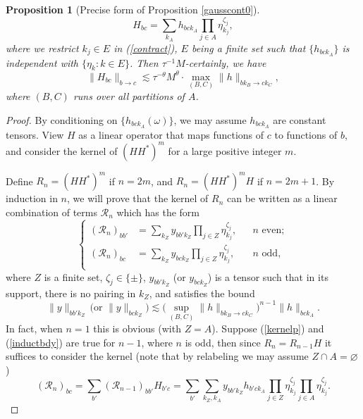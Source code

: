 \documentclass[11 pt,reqno]{amsart}
\newtheorem{prop}[thm]{Proposition}
\theoremstyle{definition}
\theoremstyle{remark}
\numberwithin{equation}{section}
\newcommand{\Rc}{\mathcal{R}}
\begin{document}
{\begin{prop}[Precise form of Proposition \ref{gausscont0}]
  \begin{equation}\label{contract}
  H_{bc}=\sum_{k_{A}}h_{bck_A}\prod_{j\in A}\eta_{k_j}^{\zeta_j},
  \end{equation}where we restrict $k_j\in E$ in (\ref{contract}), $E$ being a finite set such that $\{h_{bck_A}\}$ is independent with $\{\eta_k:k\in E\}$. Then $\tau^{-1}M$-certainly, we have
  \begin{equation}\label{contbd}\|H_{bc}\|_{b\to c}\lesssim\tau^{-\theta} M^\theta\cdot\max_{(B,C)}\|h\|_{bk_B\to ck_C},
  \end{equation} where $(B,C)$ runs over all partitions of $A$.
 \end{prop}
 \begin{proof} By conditioning on $\{h_{bck_A}(\omega)\}$, we may assume $h_{bck_A}$ are constant tensors. View $H$ as a linear operator that maps functions of $c$ to functions of $b$, and consider the kernel of $(HH^*)^m$ for a large positive integer $m$. 
 
Define $R_n=(HH^*)^m$ if $n=2m$, and $R_n=(HH^*)^mH$ if $n=2m+1$. By induction in $n$, we will prove that the kernel of $R_n$ can be written as a linear combination of terms $\Rc_n$ which has the form
 \begin{equation}\label{kernelp}
 \left\{
 \begin{aligned}
 (\Rc_n)_{bb'}&=\sum_{k_Z}y_{bb'k_Z}\prod_{j\in Z}\eta_{k_j}^{\zeta_j},&& n\textrm{ even};\\
  (\Rc_n)_{bc}&=\sum_{k_Z}y_{bck_Z}\prod_{j\in Z}\eta_{k_j}^{\zeta_j},&& n\textrm{ odd},\\
 \end{aligned}
 \right.
 \end{equation} where $Z$ is a finite set, $\zeta_j\in\{\pm\}$, $y_{bb'k_Z}$ (or $y_{bck_Z}$) is a tensor such that in its support, there is no pairing in $k_Z$, and satisfies the bound
 \begin{equation}\label{inductbdy}\|y\|_{bb'k_Z}\,\textrm{(or }\|y\|_{bck_Z})\lesssim \big(\sup_{(B,C)}\|h\|_{bk_B\to ck_C}\big)^{n-1}\|h\|_{bck_A}.
 \end{equation}In fact, when $n=1$ this is obvious (with $Z=A$). Suppose (\ref{kernelp}) and (\ref{inductbdy}) are true for $n-1$, where $n$ is odd, then since $R_n=R_{n-1}H$ it suffices to consider the kernel (note that by relabeling we may assume $Z\cap A=\varnothing$)
  \begin{equation}\label{kernelr}(\Rc_n)_{bc}=\sum_{b'}(\Rc_{n-1})_{bb'}H_{b'c}=\sum_{b'}\sum_{k_Z,k_A}y_{bb'k_Z}h_{b'ck_A}\prod_{j\in Z}\eta_{k_j}^{\zeta_j}\prod_{j\in A}\eta_{k_j}^{\zeta_j}.\end{equation}
 

\end{proof}}
\end{document}
